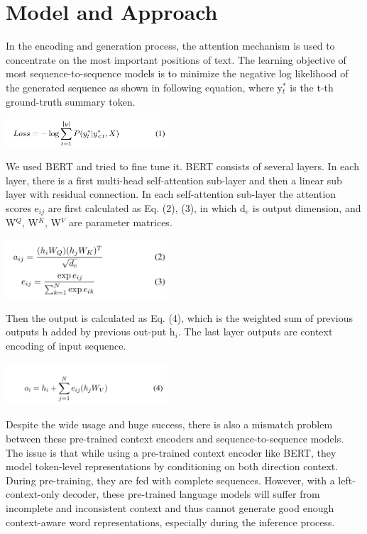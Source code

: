 \documentclass[twoside,twocolumn]{article}
\begin{document}

\section{Model and Approach}
In the encoding and generation process, the attention mechanism is used to concentrate on the most important positions of text. The learning objective of most sequence-to-sequence models is to minimize the negative log likelihood of the generated sequence as shown in following equation, where y$^*_{t}$ is the t-th ground-truth summary token.

\includegraphics[width=0.45\textwidth,height=0.9\textheight,keepaspectratio]{equal0.JPG}

We used BERT and tried to fine tune it. BERT consists of several layers. In each layer, there is a first multi-head self-attention sub-layer and then a linear sub layer with residual connection. In each self-attention sub-layer the attention scores e$_{ij}$ are first calculated as Eq. (2), (3), in which d$_{e}$ is output dimension, and W$^Q$, W$^K$, W$^V$ are parameter matrices. 

\includegraphics[width=0.45\textwidth,height=0.9\textheight,keepaspectratio]{equa1.JPG}

Then the output is calculated as Eq. (4), which is the weighted sum of previous outputs h added by previous out-put h$_{i}$. The last layer outputs are context encoding of input sequence.

\includegraphics[width=0.45\textwidth,height=0.9\textheight,keepaspectratio]{equa2.JPG}

Despite the wide usage and huge success, there is also a mismatch problem between these pre-trained context encoders and sequence-to-sequence models. The issue is that while using a pre-trained context encoder like BERT, they model token-level representations by conditioning on both direction context. During pre-training, they are fed with complete sequences. However, with a left-context-only decoder, these pre-trained language models will suffer from incomplete and inconsistent context and thus cannot generate good enough context-aware word representations, especially during the inference process.
\end{document}

